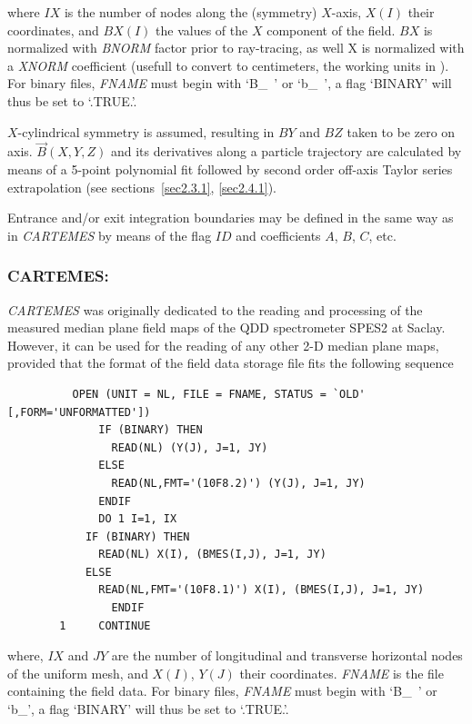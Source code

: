 \noindent where $IX$ is the number of nodes along the (symmetry) $X$-axis, $X(I)$
their coordinates, and $BX(I)$ the values of the $X$ component of the field. $BX$ is 
normalized with \textsl{BNORM} factor prior to ray-tracing, as well  X is normalized with 
a  \textsl{XNORM} coefficient (usefull to convert to centimeters, the working units in  \zgoubi). 
For binary files, \textsl{FNAME} must begin with \mbox{`B\_ '} or  \mbox{`b\_ '}, 
a flag `BINARY' will thus be set to `.TRUE.'. 

\bigskip

\noindent $X$-cylindrical symmetry is assumed, resulting in $BY$ and $BZ$ taken to 
be zero on axis. $ \vec {B} {(X,Y,Z)} $ and its derivatives along a
particle trajectory are calculated by means of a 5-point polynomial fit followed by second 
order off-axis Taylor series extrapolation (see sections~\ref{sec2.3.1}, \ref{sec2.4.1}).  
\bigskip

\noindent Entrance and/or exit integration boundaries may be defined in the same way 
as in \textsl{CARTEMES} by means of the flag $ID$ and coefficients
$A$, $B$, $C$, etc. 

\newpage

\subsubsection*{CARTEMES: \CARTEMESTitl}\label{CARTEMES}
\medskip

\textsl{CARTEMES}  was originally dedicated to the reading 
and processing of
the measured median plane field maps of the QDD spectrometer  SPES2 at Saclay.  However, it can be
used for the reading of any other 2-D median plane maps, provided that the format of the
field data storage file fits the following \FORTRAN sequence 


{\footnotesize
\begin{verbatim}
	      OPEN (UNIT = NL, FILE = FNAME, STATUS = `OLD' [,FORM='UNFORMATTED'])
              IF (BINARY) THEN 
                READ(NL) (Y(J), J=1, JY)
              ELSE
                READ(NL,FMT='(10F8.2)') (Y(J), J=1, JY)
              ENDIF
              DO 1 I=1, IX
	        IF (BINARY) THEN 
	          READ(NL) X(I), (BMES(I,J), J=1, JY)
	        ELSE
	          READ(NL,FMT='(10F8.1)') X(I), (BMES(I,J), J=1, JY) 
                ENDIF
        1     CONTINUE
\end{verbatim}}

\noindent where, $IX$  and $JY$  are the number of longitudinal
and transverse horizontal nodes of the uniform mesh, and $X(I)$, $Y(J)$ their coordinates.  
\textsl{FNAME} 
 is the file containing the field data. For binary files, \textsl{FNAME} must begin with
\mbox{`B\_ '} or \mbox{`b\_'},  a flag `BINARY' will thus be set to `.TRUE.'.  
\bigskip

